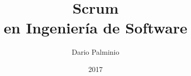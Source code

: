 
\title{\Huge 
    \textbf{Scrum}  \\ 
    \huge en Ingeniería de Software
    }

\author{Dario Palminio}

\date{2017} 

\maketitle
